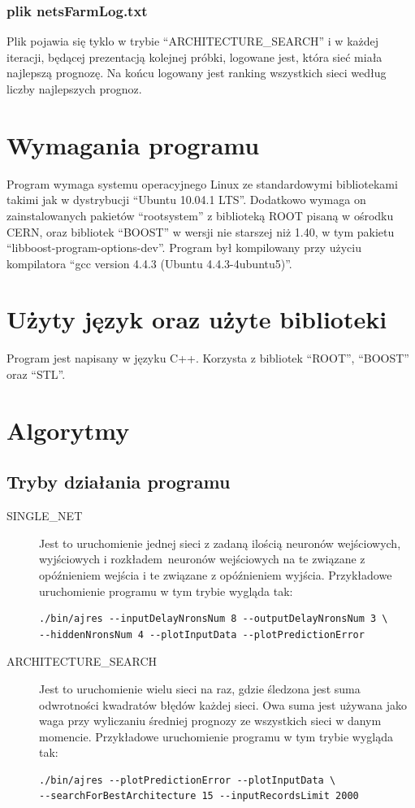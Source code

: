 \documentclass[12pt,a4]{article}
\begin{document}
\subsubsection{plik netsFarmLog.txt} Plik pojawia się tyklo w trybie ``ARCHITECTURE\_SEARCH'' i w każdej iteracji, 
będącej prezentacją kolejnej próbki, logowane jest, która sieć miała najlepszą prognozę. Na końcu logowany jest
ranking wszystkich sieci według liczby najlepszych prognoz.

\section{Wymagania programu}\label{sec:wymagania_programu}
Program wymaga systemu operacyjnego Linux ze standardowymi bibliotekami takimi jak w dystrybucji ``Ubuntu 10.04.1 LTS''.
Dodatkowo wymaga on zainstalowanych pakietów ``rootsystem'' z biblioteką ROOT pisaną w ośrodku CERN, 
oraz bibliotek ``BOOST'' w wersji nie starszej niż 1.40, w tym pakietu ``libboost-program-options-dev''.
Program był kompilowany przy użyciu kompilatora ``gcc version 4.4.3 (Ubuntu 4.4.3-4ubuntu5)''.

\section{Użyty język oraz użyte biblioteki}
Program jest napisany w języku C++. Korzysta z bibliotek ``ROOT'', ``BOOST'' oraz ``STL''.

\section{Algorytmy}
\subsection{Tryby działania programu}\label{sec:tryby_dzialania_programu}
\begin{description}
\item[SINGLE\_NET] Jest to uruchomienie jednej sieci z zadaną ilością neuronów wejściowych, wyjściowych i rozkładem\
neuronów wejściowych na te związane z opóźnieniem wejścia i te związane z opóźnieniem wyjścia. Przykładowe uruchomienie
programu w tym trybie wygląda tak:\\
\begin{verbatim}./bin/ajres --inputDelayNronsNum 8 --outputDelayNronsNum 3 \
--hiddenNronsNum 4 --plotInputData --plotPredictionError\end{verbatim}
\item[ARCHITECTURE\_SEARCH] Jest to uruchomienie wielu sieci na raz, gdzie śledzona jest suma odwrotności kwadratów błędów
każdej sieci. Owa suma jest używana jako waga przy wyliczaniu średniej prognozy ze wszystkich sieci w danym momencie.
Przykładowe uruchomienie programu w tym trybie wygląda tak:\\
\begin{verbatim}./bin/ajres --plotPredictionError --plotInputData \
--searchForBestArchitecture 15 --inputRecordsLimit 2000\end{verbatim}
\end{description}
\end{document}
